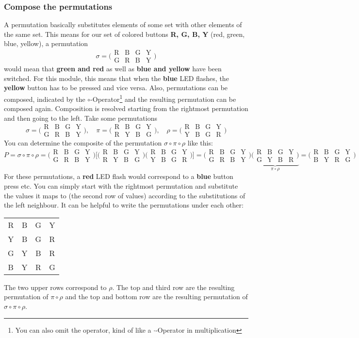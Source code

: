 \documentclass[a4paper]{article}
\newcommand{\perm}[4]{
	\bigl(\begin{smallmatrix}
		\mbox{R} & \mbox{B} & \mbox{G} & \mbox{Y} \\
		\mbox{#1}&\mbox{#2}&\mbox{#3}&\mbox{#4}
	\end{smallmatrix}\bigr)
}
\begin{document}
\subsubsection*{Compose the permutations}
A permutation basically substitutes elements of some set with other elements of the same set. This means for our set of colored buttons \textbf{R, G, B, Y} (red, green, blue, yellow), 
a permutation
\[
	\sigma = \perm{G}{R}{B}{Y}
\]
would mean that \textbf{green and red} as well as \textbf{blue and yellow} have been switched. For this module, this means that when the \textbf{blue} LED flashes, the \textbf{yellow}
button has to be pressed and vice versa. Also, permutations can be composed, indicated by the $\circ$-Operator\footnote{You can also omit the operator, kind of like a $\cdot$-Operator in multiplication} and the resulting permutation can be composed again. Composition is resolved starting from the rightmost permutation and then going to the left. Take some permutations
\[
	\sigma = \perm{G}{R}{B}{Y},\quad \pi = \perm{R}{Y}{B}{G}, \quad \rho  =\perm{Y}{B}{G}{R}
\]
You can determine the composite of the permutation $\sigma\circ\pi\circ\rho$ like this:
\[
	P=\sigma\circ\pi\circ\rho=\perm{G}{R}{B}{Y}\bigl[\perm{R}{Y}{B}{G}\perm{Y}{B}{G}{R}\bigr]=\perm{G}{R}{B}{Y}\underbrace{\perm{G}{Y}{B}{R}}_{\pi\circ\rho}=
		\perm{B}{Y}{R}{G}
\]
For these permutations, a \textbf{red} LED flash would correspond to a \textbf{blue} button press etc. You can simply start with the rightmost permutation and substitute the values it maps 
to (the second row of values) according to the substitutions of the left neighbour. It can be helpful to write the permutations under each other:
\begin{table}[h]
\centering
\def\arraystretch{2}
 \begin{tabular}{cccc}
 R & B & G & Y \\
 Y & B & G & R \\
 G & Y & B & R \\
 B & Y & R & G
 \end{tabular}
 \end{table}

\noindent
The two upper rows correspond to $\rho$. The top and third row are the resulting permutation of $\pi\circ\rho$ and the top and bottom row are the resulting permutation of $\sigma\circ\pi\circ\rho$. 
\end{document}
